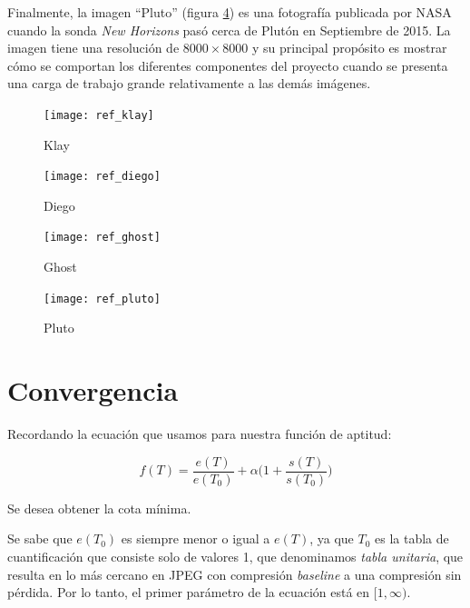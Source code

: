Finalmente, la imagen ``Pluto'' (figura \ref{fig:ref-pluto}) es una fotografía
publicada por NASA cuando la sonda \emph{New Horizons} pasó cerca de Plutón en
Septiembre de 2015. La imagen tiene una resolución de $8000\times8000$ y su
principal propósito es mostrar cómo se comportan los diferentes componentes del
proyecto cuando se presenta una carga de trabajo grande relativamente a las
demás imágenes.

\begin{figure}[b]
    \texttt{[image: ref\_klay]}
    \caption{Klay}
    \label{fig:ref-klay}
\end{figure}

\begin{figure}[b]
    \texttt{[image: ref\_diego]}
    \caption{Diego}
    \label{fig:ref-diego}
\end{figure}

\begin{figure}[b]
    \texttt{[image: ref\_ghost]}
    \caption{Ghost}
    \label{fig:ref-ghost}
\end{figure}

\begin{figure}[b]
    \texttt{[image: ref\_pluto]}
    \caption{Pluto}
    \label{fig:ref-pluto}
\end{figure}


\section{Convergencia}

Recordando la ecuación que usamos para nuestra función de aptitud:

\begin{equation}
f(T) = \frac{e(T)}{e(T_0)} + \alpha \Big(1 + \frac{s(T)}{s(T_0)}\Big)
\end{equation}\label{eq:fitness-repeated}

Se desea obtener la cota mínima.

Se sabe que $e(T_0)$ es siempre menor o igual a $e(T)$, ya que $T_0$ es la
tabla de cuantificación que consiste solo de valores 1, que denominamos
\emph{tabla unitaria}, que resulta en lo más cercano en JPEG con compresión
\emph{baseline} a una compresión sin pérdida. Por lo tanto, el primer parámetro
de la ecuación está en $[1, \infty)$.

